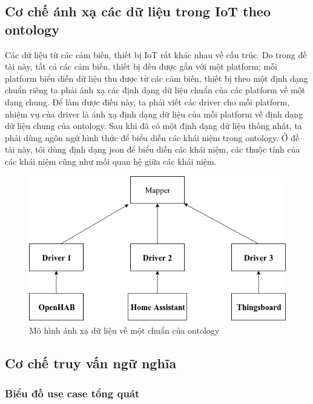 \subsection{Cơ chế ánh xạ các dữ liệu trong IoT theo ontology}
Các dữ liệu từ các cảm biến, thiết bị IoT rất khác nhau về cấu trúc. Do trong đề tài này, tất cả các cảm biến, thiết bị đều được gắn với một platform; mỗi platform biểu diễn dữ liệu thu được từ các cảm biến, thiết bị theo một định dạng chuẩn riêng ta phải ánh xạ các định dạng dữ liệu chuẩn của các platform về một dạng chung. Để làm được điều này, ta phải viết các driver cho mỗi platform, nhiệm vụ của driver là ánh xạ định dạng dữ liệu của mỗi platform về định dạng dữ liệu chung của ontology.
Sau khi đã có một định dạng dữ liệu thống nhất, ta phải dùng ngôn ngữ hình thức để biểu diễn các khái niệm trong ontology. Ở đề tài này, tôi dùng định dạng json để biểu diễn các khái niệm, các thuộc tính của các khái niệm cũng như mối quan hệ giữa các khái niệm. 
\begin{figure}[h!]
	\center
	\includegraphics[scale=0.6]{image/mapping_service}
	\caption{Mô hình ánh xạ dữ liệu về một chuẩn của ontology}
\end{figure}

\subsection{Cơ chế truy vấn ngữ nghĩa}
\subsubsection{Biểu đồ use case tổng quát}

